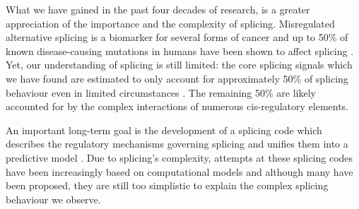 What we have gained in the past four decades of research, is a greater appreciation of the importance and the complexity of splicing. 
Misregulated alternative splicing is a biomarker for several forms of cancer \cite{cancer} \cite{splicingcausescancer} and up to 50\% of known disease-causing mutations in humans have been shown to affect splicing \cite{50diseasessplicing}. 
Yet, our understanding of splicing is still limited: the core splicing signals which we have found are estimated to only account for approximately 50\% of splicing behaviour even in limited circumstances \cite{coresplicingsignals50percentexplainit}. The remaining 50\% are likely accounted for by the complex interactions of numerous cis-regulatory elements. 

An important long-term goal is the development of a splicing code which describes the regulatory mechanisms governing splicing and unifies them into a predictive model \cite{longtermcall}. Due to splicing's complexity, attempts at these splicing codes have been increasingly based on computational models \cite{barash2010a} and although many have been proposed, they are still too simplistic to explain the complex splicing behaviour we observe. %



%
%









